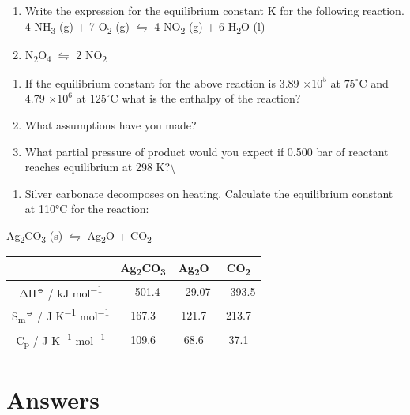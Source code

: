 \documentclass[
]{book}
\providecommand{\tightlist}{%
  \setlength{\itemsep}{0pt}\setlength{\parskip}{0pt}}
\begin{document}
\begin{enumerate}
\def\labelenumi{\arabic{enumi}.}
\item
  Write the expression for the equilibrium constant K for the following reaction.
  4 NH\textsubscript{3} (g) + 7 O\textsubscript{2} (g) \(\leftrightharpoons\) 4 NO\textsubscript{2} (g) + 6 H\textsubscript{2}O (l)
\item
  N\textsubscript{2}O\textsubscript{4} \(\leftrightharpoons\) 2 NO\textsubscript{2}
\end{enumerate}

\begin{enumerate}
\def\labelenumi{\alph{enumi}.}
\item
  If the equilibrium constant for the above reaction is 3.89 \(\times 10^5\) at \(75 ^{\circ}\)C and 4.79 \(\times 10^6\) at \(125 ^{\circ}\)C what is the enthalpy of the reaction?
\item
  What assumptions have you made?
\item
  What partial pressure of product would you expect if 0.500 bar of reactant reaches equilibrium at 298 K?\textbackslash{}
\end{enumerate}

\begin{enumerate}
\def\labelenumi{\arabic{enumi}.}
\setcounter{enumi}{2}
\tightlist
\item
  Silver carbonate decomposes on heating. Calculate the equilibrium constant at 110°C for the reaction:
\end{enumerate}

Ag\textsubscript{2}CO\textsubscript{3} (s) \(\leftrightharpoons\) Ag\textsubscript{2}O + CO\textsubscript{2}

\begin{longtable}[]{@{}cccc@{}}
\toprule
& Ag\textsubscript{2}CO\textsubscript{3} & Ag\textsubscript{2}O & CO\textsubscript{2}\tabularnewline
\midrule
\endhead
ΔH\textsuperscript{⦵} / kJ mol\textsuperscript{−1} & −501.4 & −29.07 & −393.5\tabularnewline
S\textsubscript{m}\textsuperscript{⦵} / J K\textsuperscript{−1} mol\textsuperscript{−1} & 167.3 & 121.7 & 213.7\tabularnewline
C\textsubscript{p} / J K\textsuperscript{−1} mol\textsuperscript{−1} & 109.6 & 68.6 & 37.1\tabularnewline
\bottomrule
\end{longtable}

\hypertarget{sec:w4p2answer}{%
\section{Answers}\label{sec:w4p2answer}}
\end{document}
